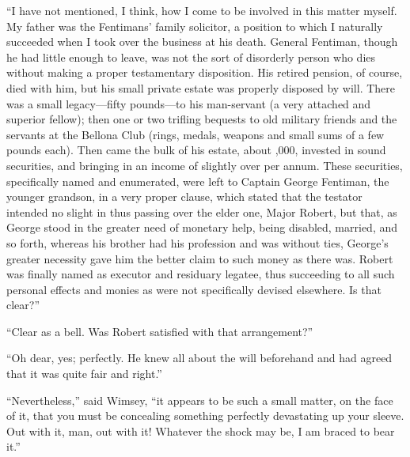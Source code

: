 \enquote{I have not mentioned, I think, how I come to be involved in this matter myself. My father was the Fentimans' family solicitor, a position to which I naturally succeeded when I took over the business at his death. General Fentiman, though he had little enough to leave, was not the sort of disorderly person who dies without making a proper testamentary disposition. His retired pension, of course, died with him, but his small private estate was properly disposed by will. There was a small legacy\allowbreak---\allowbreak fifty pounds\allowbreak---\allowbreak to his man-servant (a very attached and superior fellow); then one or two trifling bequests to old military friends and the servants at the Bellona Club (rings, medals, weapons and small sums of a few pounds each). Then came the bulk of his estate, about ,000, invested in sound securities, and bringing in an income of slightly over  per annum. These securities, specifically named and enumerated, were left to Captain George Fentiman, the younger grandson, in a very proper clause, which stated that the testator intended no slight in thus passing over the elder one, Major Robert, but that, as George stood in the greater need of monetary help, being disabled, married, and so forth, whereas his brother had his profession and was without ties, George's greater necessity gave him the better claim to such money as there was. Robert was finally named as executor and residuary legatee, thus succeeding to all such personal effects and monies as were not specifically devised elsewhere. Is that clear?}

\enquote{Clear as a bell. Was Robert satisfied with that arrangement?}

\enquote{Oh dear, yes; perfectly. He knew all about the will beforehand and had agreed that it was quite fair and right.}

\enquote{Nevertheless,} said Wimsey, \enquote{it appears to be such a small matter, on the face of it, that you must be concealing something perfectly devastating up your sleeve. Out with it, man, out with it! Whatever the shock may be, I am braced to bear it.}

